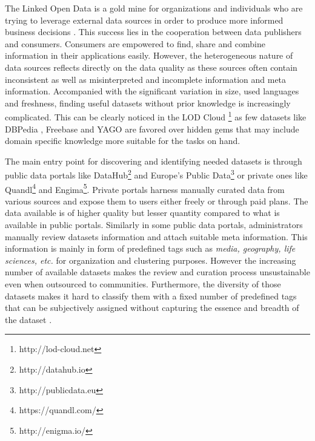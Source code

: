 \documentclass[runningheads,a4paper]{llncs}
\begin{document}
The Linked Open Data is a gold mine for organizations and individuals who are trying to leverage external data sources in order to produce more informed business decisions \cite{Boyd2011}. This success lies in the cooperation between data publishers and consumers. Consumers are empowered to find, share and combine information in their applications easily. However, the heterogeneous nature of data sources reflects directly on the data quality as these sources often contain inconsistent as well as misinterpreted and incomplete information and meta information. Accompanied with the significant variation in size, used languages and freshness, finding useful datasets without prior knowledge is increasingly complicated. This can be clearly noticed in the LOD Cloud \footnote{http://lod-cloud.net} as few datasets like DBPedia \cite{Bizer:2009:DCP:1640541.1640848}, Freebase \cite{Bollacker:2008:FCC:1376616.1376746} and YAGO \cite{Suchanek:2007:YCS:1242572.1242667} are favored over hidden gems that may include domain specific knowledge more suitable for the tasks on hand.

The main entry point for discovering and identifying needed datasets is through public data portals like DataHub\footnote{http://datahub.io} and Europe's Public Data\footnote{http://publicdata.eu} or private ones like Quandl\footnote{https://quandl.com/} and Engima\footnote{http://enigma.io/}. Private portals harness manually curated data from various sources and expose them to users either freely or through paid plans. The data available is of higher quality but lesser quantity compared to what is available in public portals. Similarly in some public data portals, administrators manually review datasets information and attach suitable meta information. This information is mainly in form of predefined tags such as \textit{media, geography, life sciences, etc.} for organization and clustering purposes.
However the increasing number of available datasets makes the review and curation process unsustainable even when outsourced to communities. Furthermore, the diversity of those datasets makes it hard to classify them with a fixed number of predefined tags that can be subjectively assigned without capturing the essence and breadth of the dataset \cite{6690016}.
\end{document}
